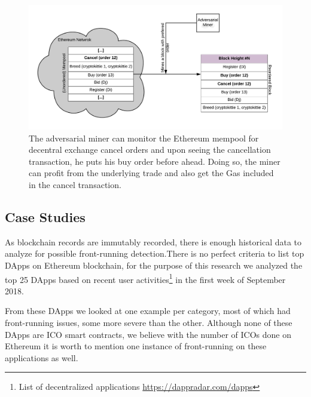\begin{figure}[h]
\centering
\includegraphics[width=0.7\linewidth]{figures/Miner_reorder_frontrun.png}
\caption{The adversarial miner can monitor the Ethereum mempool for decentral exchange cancel orders and upon seeing the cancellation transaction, he puts his buy order before ahead. Doing so, the miner can profit from the underlying trade and also get the Gas included in the cancel transaction. \label{fig:MinerFrontrunning}} 
\end{figure}



\subsection{Case Studies}  
As blockchain records are immutably recorded, there is enough historical data to analyze for possible front-running detection.There is no perfect criteria to list top DApps on Ethereum blockchain, for the purpose of this research we analyzed the top 25 DApps based on recent user activities\footnote{List of decentralized applications \url{https://dappradar.com/dapps}} in the first week of September 2018.




From these DApps we looked at one example per category, most of which had front-running issues, some more severe than the other. Although none of these DApps are ICO smart contracts, we believe with the number of ICOs done on Ethereum it is worth to mention one instance of front-running on these applications as well. 



